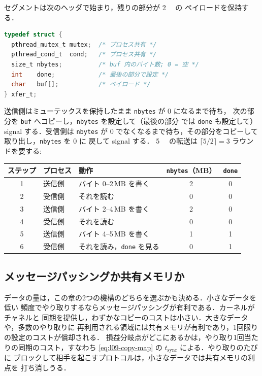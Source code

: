 \documentclass[../main.tex]{subfiles}
\begin{document}
\begin{example}
  \label{ex:l09-rounds}
  セグメントは次のヘッダで始まり，残りの部分が \SI{2}{\mega\byte} の
  ペイロードを保持する．
  \begin{lstlisting}[language=C, numbers=none]
typedef struct {
  pthread_mutex_t mutex;  /* プロセス共有 */
  pthread_cond_t  cond;   /* プロセス共有 */
  size_t nbytes;          /* buf 内のバイト数; 0 = 空 */
  int    done;            /* 最後の部分で設定 */
  char   buf[];           /* ペイロード */
} xfer_t;
\end{lstlisting}
  送信側はミューテックスを保持したまま \texttt{nbytes} が 0 になるまで待ち，
  次の部分を \texttt{buf} へコピーし，\texttt{nbytes} を設定して（最後の部分
  では \texttt{done} も設定して）signal する．受信側は \texttt{nbytes} が
  0 でなくなるまで待ち，その部分をコピーして取り出し，\texttt{nbytes} を 0 に
  戻して signal する．%
  \SI{5}{\mega\byte} の転送は $\lceil 5/2 \rceil = 3$
  ラウンドを要する:
  \begin{center}
    \small
    \begin{tabular}{@{}cllcc@{}}
      \toprule
      ステップ & プロセス & 動作 & \texttt{nbytes}（MB） & \texttt{done} \\
      \midrule
      1 & 送信側 & バイト 0--2\,MB を書く & 2 & 0 \\
      2 & 受信側 & それを読む            & 0 & 0 \\
      3 & 送信側 & バイト 2--4\,MB を書く & 2 & 0 \\
      4 & 受信側 & それを読む            & 0 & 0 \\
      5 & 送信側 & バイト 4--5\,MB を書く & 1 & 1 \\
      6 & 受信側 & それを読み，\texttt{done} を見る & 0 & 1 \\
      \bottomrule
    \end{tabular}
  \end{center}
\end{example}

\subsection{メッセージパッシングか共有メモリか}

データの量は，この章の2つの機構のどちらを選ぶかも決める．小さなデータを低い
頻度でやり取りするならメッセージパッシングが有利である．カーネルがチャネルと
同期を提供し，わずかなコピーのコストは小さい．大きなデータや，多数のやり取りに
再利用される領域には共有メモリが有利であり，1回限りの設定のコストが償却される．
損益分岐点がどこにあるかは，やり取り1回当たりの同期のコスト，すなわち
\cref{eq:l09-copy-map} の $t_{\mathrm{sync}}$ による．やり取りのたびに
ブロックして相手を起こすプロトコルは，小さなデータでは共有メモリの利点を
打ち消しうる．
\end{document}
